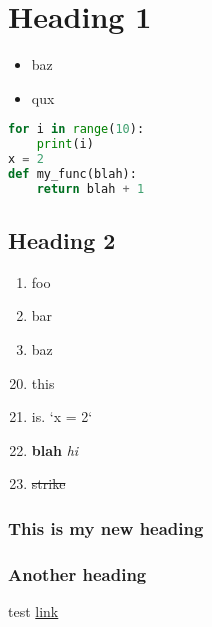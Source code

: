 \documentclass{article}
\begin{document}
\section{Heading 1}
\begin{itemize}
    \item baz
    \item qux
\end{itemize}

\begin{lstlisting}[language=python, style=myStyle]
for i in range(10):
    print(i)
x = 2
def my_func(blah):
    return blah + 1
\end{lstlisting}

\subsection{Heading 2}
\begin{enumerate}
    \setcounter{enumi}{0}
    \item  foo
    \item  bar
    \item  baz
\end{enumerate}

\begin{enumerate}
    \setcounter{enumi}{19}
    \item  this
    \item  is. `x = 2`
    \item  \textbf{blah} \textit{hi}
    \item  \sout{strike}
\end{enumerate}

\subsubsection{This is my new heading}
\subsubsection{Another heading}
test \href{https://duckduckgo.com}{link}
\end{document}
